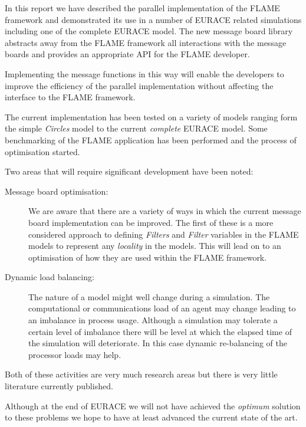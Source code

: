 In this report we have described the parallel implementation of the FLAME framework and
demonstrated its use in a number of EURACE related simulations including one of the complete EURACE model. The new message board library abstracts away from the FLAME framework all interactions with the message boards and provides an appropriate API for the FLAME developer.

Implementing the message functions in this way will enable the developers to improve the  efficiency of the parallel implementation without affecting the interface to the FLAME framework.

The current implementation has been tested on a variety of models ranging form the simple \textsl{Circles} model to the current \textsl{complete} EURACE model. Some benchmarking of the FLAME application has been performed and the process of optimisation started.

Two areas that will require significant development have been noted:
\begin{description}
	\item [Message board optimisation:] We are aware that there are a variety of ways in which the current message board implementation can be improved. The first of these is a more considered approach to defining \textsl{Filters} and \textsl{Filter} variables in the FLAME models to represent any \textsl{locality} in the models. This will lead on to an optimisation of how they are used within the FLAME framework.
 \item [Dynamic load balancing:] The nature of a model might well change during a simulation. The computational or communications load of an agent may change leading to an imbalance in process usage. Although a simulation may tolerate a certain level of imbalance there will be level at which the elapsed time of the simulation will deteriorate. In this case dynamic re-balancing of the processor loads may help.
 \end{description}
Both of these activities are very much research areas but there is very little literature currently published.

Although at the end of EURACE we will not have achieved the \textsl{optimum} solution to these problems we hope to have at least advanced the current state of the art.
